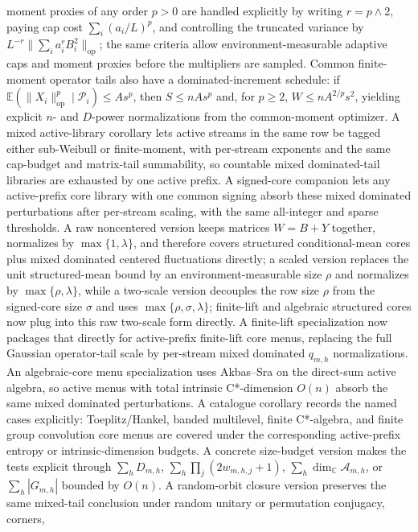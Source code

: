 \documentclass[11pt]{article}
\begin{document}
moment proxies of any order \(p>0\) are handled explicitly by writing
\(r=p\wedge2\), paying cap cost \(\sum_i(a_i/L)^p\), and controlling the
truncated variance by \(L^{-r}\|\sum_i a_i^rB_i^2\|_{\mathrm{op}}\); the same
criteria allow environment-measurable adaptive caps and moment proxies before
the multipliers are sampled.  Common finite-moment operator tails also have a
dominated-increment schedule: if
\(\mathbb E(\|X_i\|_{\mathrm{op}}^p\mid\mathcal P_i)\le As^p\), then
\(S\le nAs^p\) and, for \(p\ge2\), \(W\le nA^{2/p}s^2\), yielding explicit
\(n\)- and \(D\)-power normalizations from the common-moment optimizer.  A mixed
active-library corollary lets active streams in the same row be tagged either
sub-Weibull or finite-moment, with per-stream exponents and the same cap-budget
and matrix-tail summability, so countable mixed dominated-tail libraries are
exhausted by one active prefix.  A signed-core companion lets any active-prefix
core library with one common signing absorb these mixed dominated perturbations
after per-stream scaling, with the same all-integer and sparse thresholds.  A
raw noncentered version keeps matrices \(W=B+Y\) together, normalizes by
\(\max\{1,\lambda\}\), and therefore covers structured conditional-mean cores
plus mixed dominated centered fluctuations directly; a scaled version replaces
the unit structured-mean bound by an environment-measurable size \(\rho\) and
normalizes by \(\max\{\rho,\lambda\}\), while a two-scale version decouples the
row size \(\rho\) from the signed-core size \(\sigma\) and uses
\(\max\{\rho,\sigma,\lambda\}\); finite-lift and algebraic structured cores now
plug into this raw two-scale form directly.  A
finite-lift specialization now packages that directly for active-prefix
finite-lift core menus, replacing the full Gaussian operator-tail scale by
per-stream mixed dominated \(q_{m,h}\) normalizations.  An algebraic-core menu
specialization uses Akbas--Sra on the direct-sum active algebra, so active menus
with total intrinsic C*-dimension \(O(n)\) absorb the same mixed dominated
perturbations.  A catalogue corollary records the named cases explicitly:
Toeplitz/Hankel, banded multilevel, finite C*-algebra, and finite group
convolution core menus are covered under the corresponding active-prefix
entropy or intrinsic-dimension budgets.  A concrete size-budget version makes
the tests explicit through \(\sum_h D_{m,h}\),
\(\sum_h\prod_j(2w_{m,h,j}+1)\),
\(\sum_h\dim_{\mathbb C}\mathcal A_{m,h}\), or \(\sum_h |G_{m,h}|\)
bounded by \(O(n)\).  A random-orbit closure version preserves the same
mixed-tail conclusion under random unitary or permutation conjugacy, corners,
\end{document}
